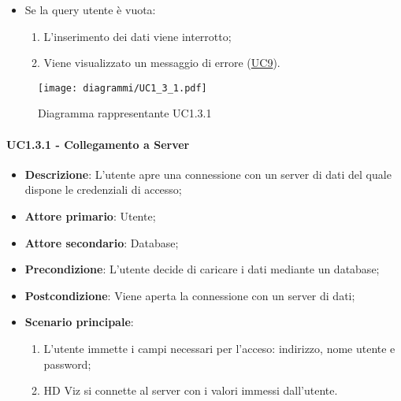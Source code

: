 \begin{itemize}
\begin{itemize}
        \item Se la query utente è vuota:
        \begin{enumerate}
            \item L'inserimento dei dati viene interrotto;
            \item Viene visualizzato un messaggio di errore (\hyperref[sub:uc9]{UC9}).
        \end{enumerate}
    \end{itemize}
\end{itemize}


\newpage
\begin{figure}[h]
    \centering
    \texttt{[image: diagrammi/UC1\_3\_1.pdf]}
    \caption{Diagramma rappresentante UC1.3.1}
    \label{fig:UC1.3.1}
\end{figure}


\paragraph{UC1.3.1 - Collegamento a Server}
\label{par:uc1.3.1}
\begin{itemize}
    \item \textbf{Descrizione}: L'utente apre una connessione con un server di dati del quale 
                                dispone le credenziali di accesso;

    \item \textbf{Attore primario}: Utente;
    \item \textbf{Attore secondario}: Database;
    
    \item \textbf{Precondizione}:   L'utente decide di caricare i dati mediante un database;
    \item \textbf{Postcondizione}:  Viene aperta la connessione con un server di dati;

	\item \textbf{Scenario principale}:
		\begin{enumerate}
			\item L'utente immette i campi necessari per l'acceso: indirizzo, nome utente e password;
			\item HD Viz si connette al server con i valori immessi dall'utente.
        \end{enumerate}
    \end{itemize}


